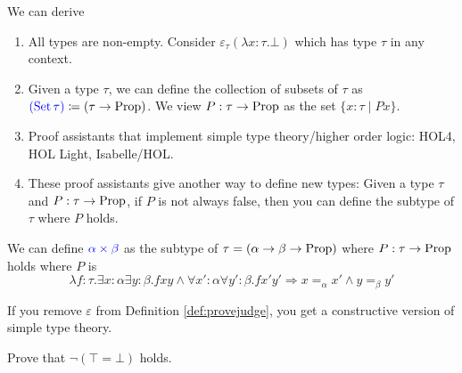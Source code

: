 \begin{boxlem}
    We can derive 
    \begin{prooftree}
    \end{prooftree}
\end{boxlem}

\begin{rem}
    \hfill
    \begin{enumerate}
        \item {All types are non-empty.
            Consider $\varepsilon_\tau(\lambda x : \tau. \bot)$ which has type $\tau$ in any context.}
        \item {Given a type $\tau$, we can define the collection of subsets of $\tau$ as $\alert{(\set \tau)} \coloneq (\tau \to \proptype)$. 
        We view $P : \tau \to \proptype$ as the set $\{ x : \tau \mid P x\}$.}
        \item {Proof assistants that implement simple type theory/higher order logic: HOL4, HOL Light, Isabelle/HOL.}
        \item {These proof assistants give another way to define new types: 
            Given a type $\tau$ and $P : \tau \to \proptype$, if $P$ is not always false, then you can define the subtype of $\tau$ where $P$ holds.}
    \end{enumerate}
\end{rem}

\begin{example}
    We can define $\alert{\alpha \times \beta}$ as the subtype of $\tau = (\alpha \to \beta \to \proptype)$ where $P : \tau \to \proptype$ holds where $P$ is 
    \begin{equation*}
        \lambda f : \tau. \exists x : \alpha \exists y : \beta. f x y \wedge \forall x' : \alpha \forall y' : \beta. f x' y' \Rightarrow x \mathrel{=_\alpha} x' \wedge y \mathrel{=_\beta} y'
    \end{equation*}
\end{example}

\begin{rem}
    If you remove $\varepsilon$ from Definition \ref{def:provejudge}, you get a constructive version of simple type theory.
\end{rem}

\begin{exercise}\label{exe:topnebot}
    Prove that $\neg(\top = \bot)$ holds.
\end{exercise}

